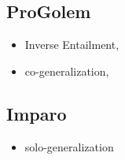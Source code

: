 \subsection{ProGolem}
\begin{itemize}
\item Inverse Entailment,
\item co-generalization, 
\end{itemize}

\subsection{Imparo}
\begin{itemize}
\item solo-generalization
\end{itemize}
